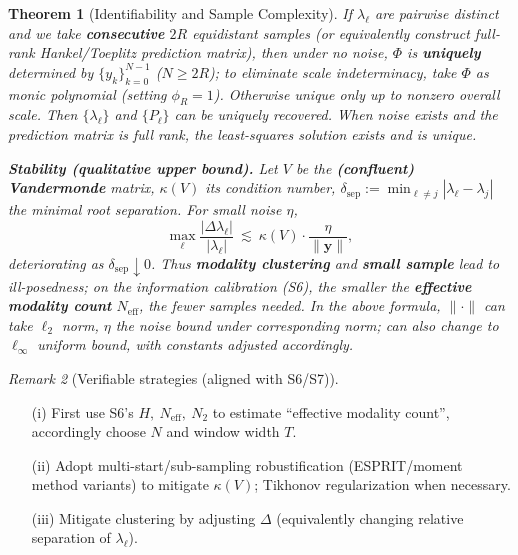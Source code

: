 \documentclass[11pt,a4paper]{article}
\newtheorem{theorem}{Theorem}[section]
\theoremstyle{remark}
\newtheorem{remark}[theorem]{Remark}
\begin{document}
\begin{theorem}[Identifiability and Sample Complexity]\label{thm:identifiability}
If $\lambda_\ell$ are pairwise distinct and we take \textbf{consecutive} $2R$ equidistant samples (or equivalently construct full-rank Hankel/Toeplitz prediction matrix), then under no noise, $\Phi$ is \textbf{uniquely} determined by $\{y_k\}_{k=0}^{N-1}$ ($N\ge 2R$); to eliminate scale indeterminacy, take $\Phi$ as monic polynomial (setting $\phi_R=1$). Otherwise unique only up to nonzero overall scale. Then $\{\lambda_\ell\}$ and $\{P_\ell\}$ can be uniquely recovered. When noise exists and the prediction matrix is full rank, the least-squares solution exists and is unique.

\textbf{Stability (qualitative upper bound).} Let $V$ be the \textbf{(confluent) Vandermonde} matrix, $\kappa(V)$ its condition number, $\delta_{\mathrm{sep}}:=\min_{\ell\ne j}|\lambda_\ell-\lambda_j|$ the minimal root separation. For small noise $\eta$,
\begin{equation}
\max_\ell \frac{|\Delta\lambda_\ell|}{|\lambda_\ell|}
\ \lesssim\ \kappa(V)\cdot \frac{\eta}{\|\mathbf{y}\|},
\end{equation}
deteriorating as $\delta_{\mathrm{sep}}\downarrow 0$. Thus \textbf{modality clustering} and \textbf{small sample} lead to ill-posedness; on the information calibration (S6), the smaller the \textbf{effective modality count} $N_{\mathrm{eff}}$, the fewer samples needed. In the above formula, $\|\cdot\|$ can take $\ell_2$ norm, $\eta$ the noise bound under corresponding norm; can also change to $\ell_\infty$ uniform bound, with constants adjusted accordingly.
\end{theorem}

\begin{remark}[Verifiable strategies (aligned with S6/S7)]
\begin{enumerate}
\item[(i)] First use S6's $H,\ N_{\mathrm{eff}},\ N_2$ to estimate ``effective modality count'', accordingly choose $N$ and window width $T$.
\item[(ii)] Adopt multi-start/sub-sampling robustification (ESPRIT/moment method variants) to mitigate $\kappa(V)$; Tikhonov regularization when necessary.
\item[(iii)] Mitigate clustering by adjusting $\Delta$ (equivalently changing relative separation of $\lambda_\ell$).
\end{enumerate}
\end{remark}
\end{document}
